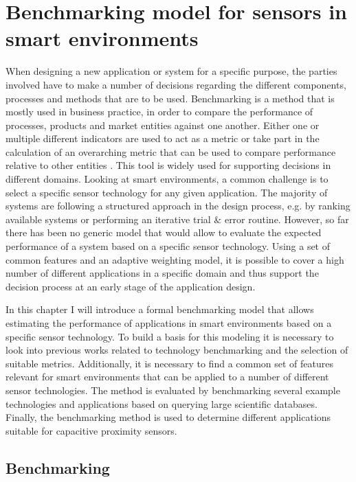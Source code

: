 \chapter{Benchmarking model for sensors in smart environments} 
\label{ch:benchmark}
When designing a new application or system for a specific purpose, the parties involved have to make a number of decisions regarding the different components, processes and methods that are to be used. Benchmarking is a method that is mostly used in business practice, in order to compare the performance of processes, products and market entities against one another. Either one or multiple different indicators are used to act as a metric or take part in the calculation of an overarching metric that can be used to compare performance relative to other entities \cite{camp1989benchmarking}. This tool is widely used for supporting decisions in different domains. Looking at smart environments, a common challenge is to select a specific sensor technology for any given application. The majority of systems are following a structured approach in the design process, e.g. by ranking available systems or performing an iterative trial \& error routine. However, so far there has been no generic model that would allow to evaluate the expected performance of a system based on a specific sensor technology. Using a set of common features and an adaptive weighting model, it is possible to cover a high number of different applications in a specific domain and thus support the decision process at an early stage of the application design. 

In this chapter I will introduce a formal benchmarking model that allows estimating the performance of applications in smart environments based on a specific sensor technology. To build a basis for this modeling it is necessary to look into previous works related to technology benchmarking and the selection of suitable metrics. Additionally, it is necessary to find a common set of features relevant for smart environments that can be applied to a number of different sensor technologies. The method is evaluated by benchmarking several example technologies and applications based on querying large scientific databases. Finally, the benchmarking method is used to determine different applications suitable for capacitive proximity sensors.

\section{Benchmarking}

